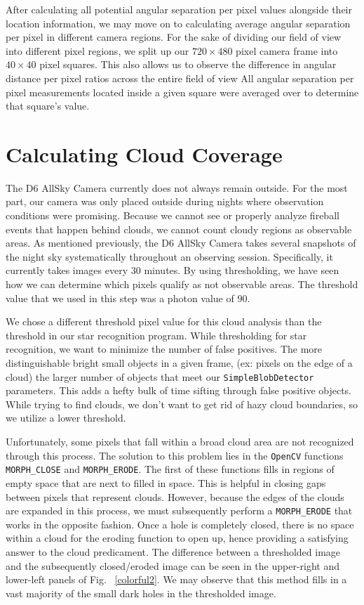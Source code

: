 After calculating all potential angular separation per pixel values alongside their location information, we may move on to calculating average angular separation per pixel in different camera regions.
For the sake of dividing our field of view into different pixel regions, we split up our $720 \times 480$ pixel camera frame into $40 \times 40$ pixel squares.
This also allows us to observe the difference in angular distance per pixel ratios across the entire field of view
All angular separation per pixel measurements located inside a given square were averaged over to determine that square's value.




\section{Calculating Cloud Coverage}

The D6 AllSky Camera currently does not always remain outside.
For the most part, our camera was only placed outside during nights where observation conditions were promising.
Because we cannot see or properly analyze fireball events that happen behind clouds, we cannot count cloudy regions as observable areas.
As mentioned previously, the D6 AllSky Camera takes several snapshots of the night sky systematically throughout an observing session.
Specifically, it currently takes images every $30$ minutes.
By using thresholding, we have seen how we can determine which pixels qualify as not observable areas.
The threshold value that we used in this step was a photon value of $90$.


We chose a different threshold pixel value for this cloud analysis than the threshold in our star recognition program.
While thresholding for star recognition, we want to minimize the number of false positives.
The more distinguishable bright small objects in a given frame, (ex: pixels on the edge of a cloud) the larger number of objects that meet our \texttt{SimpleBlobDetector} parameters.
This adds a hefty bulk of time sifting through false positive objects.
While trying to find clouds, we don't want to get rid of hazy cloud boundaries, so we utilize a lower threshold.

Unfortunately, some pixels that fall within a broad cloud area are not recognized through this process.
The solution to this problem lies in the \texttt{OpenCV} functions \texttt{MORPH\_CLOSE} and \texttt{MORPH\_ERODE}.
The first of these functions fills in regions of empty space that are next to filled in space.
This is helpful in closing gaps between pixels that represent clouds.
However, because the edges of the clouds are expanded in this process, we must subsequently perform a \texttt{MORPH\_ERODE} that works in the opposite fashion.
Once a hole is completely closed, there is no space within a cloud for the eroding function to open up, hence providing a satisfying answer to the cloud predicament. 
The difference between a thresholded image and the subsequently closed/eroded image can be seen in the upper-right and lower-left panels of Fig. ~\ref{colorful2}.
We may observe that this method fills in a vast majority of the small dark holes in the thresholded image.

